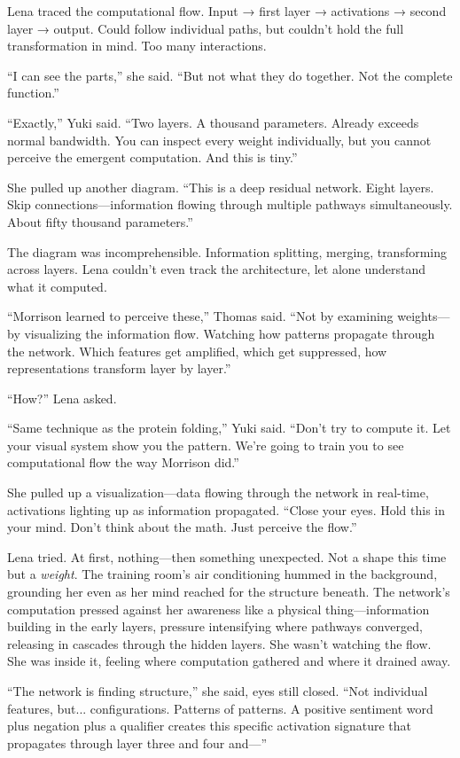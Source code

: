 Lena traced the computational flow. Input → first layer → activations → second layer → output. Could follow individual paths, but couldn't hold the full transformation in mind. Too many interactions.

``I can see the parts,'' she said. ``But not what they do together. Not the complete function.''

``Exactly,'' Yuki said. ``Two layers. A thousand parameters. Already exceeds normal bandwidth. You can inspect every weight individually, but you cannot perceive the emergent computation. And this is tiny.''

She pulled up another diagram. ``This is a deep residual network. Eight layers. Skip connections—information flowing through multiple pathways simultaneously. About fifty thousand parameters.''

The diagram was incomprehensible. Information splitting, merging, transforming across layers. Lena couldn't even track the architecture, let alone understand what it computed.

``Morrison learned to perceive these,'' Thomas said. ``Not by examining weights—by visualizing the information flow. Watching how patterns propagate through the network. Which features get amplified, which get suppressed, how representations transform layer by layer.''

``How?'' Lena asked.

``Same technique as the protein folding,'' Yuki said. ``Don't try to compute it. Let your visual system show you the pattern. We're going to train you to see computational flow the way Morrison did.''

She pulled up a visualization—data flowing through the network in real-time, activations lighting up as information propagated. ``Close your eyes. Hold this in your mind. Don't think about the math. Just perceive the flow.''

Lena tried. At first, nothing—then something unexpected. Not a shape this time but a \textit{weight}. The training room's air conditioning hummed in the background, grounding her even as her mind reached for the structure beneath. The network's computation pressed against her awareness like a physical thing—information building in the early layers, pressure intensifying where pathways converged, releasing in cascades through the hidden layers. She wasn't watching the flow. She was inside it, feeling where computation gathered and where it drained away.

``The network is finding structure,'' she said, eyes still closed. ``Not individual features, but... configurations. Patterns of patterns. A positive sentiment word plus negation plus a qualifier creates this specific activation signature that propagates through layer three and four and—''

